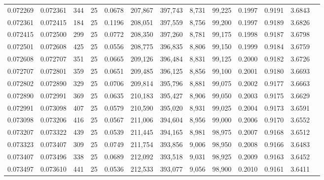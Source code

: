 \begin{tabular}{rrrrrrrrrrrrr}
0.072269 & 0.072361 &   344 &  25 &                                     0.0678 & 207,867 & 397,743 &   8,731 &  99,225 & 0.1997 & 0.9191 & 3.6843 \\
0.072361 & 0.072415 &   184 &  25 &                                     0.1196 & 208,051 & 397,559 &   8,756 &  99,200 & 0.1997 & 0.9189 & 3.6826 \\
0.072415 & 0.072500 &   299 &  25 &                                     0.0772 & 208,350 & 397,260 &   8,781 &  99,175 & 0.1998 & 0.9187 & 3.6798 \\
0.072501 & 0.072608 &   425 &  25 &                                     0.0556 & 208,775 & 396,835 &   8,806 &  99,150 & 0.1999 & 0.9184 & 3.6759 \\
0.072608 & 0.072707 &   351 &  25 &                                     0.0665 & 209,126 & 396,484 &   8,831 &  99,125 & 0.2000 & 0.9182 & 3.6726 \\
0.072707 & 0.072801 &   359 &  25 &                                     0.0651 & 209,485 & 396,125 &   8,856 &  99,100 & 0.2001 & 0.9180 & 3.6693 \\
0.072802 & 0.072890 &   329 &  25 &                                     0.0706 & 209,814 & 395,796 &   8,881 &  99,075 & 0.2002 & 0.9177 & 3.6663 \\
0.072890 & 0.072991 &   369 &  25 &                                     0.0635 & 210,183 & 395,427 &   8,906 &  99,050 & 0.2003 & 0.9175 & 3.6629 \\
0.072991 & 0.073098 &   407 &  25 &                                     0.0579 & 210,590 & 395,020 &   8,931 &  99,025 & 0.2004 & 0.9173 & 3.6591 \\
0.073098 & 0.073206 &   416 &  25 &                                     0.0567 & 211,006 & 394,604 &   8,956 &  99,000 & 0.2006 & 0.9170 & 3.6552 \\
0.073207 & 0.073322 &   439 &  25 &                                     0.0539 & 211,445 & 394,165 &   8,981 &  98,975 & 0.2007 & 0.9168 & 3.6512 \\
0.073323 & 0.073407 &   309 &  25 &                                     0.0749 & 211,754 & 393,856 &   9,006 &  98,950 & 0.2008 & 0.9166 & 3.6483 \\
0.073407 & 0.073496 &   338 &  25 &                                     0.0689 & 212,092 & 393,518 &   9,031 &  98,925 & 0.2009 & 0.9163 & 3.6452 \\
0.073497 & 0.073610 &   441 &  25 &                                     0.0536 & 212,533 & 393,077 &   9,056 &  98,900 & 0.2010 & 0.9161 & 3.6411 \\

\end{tabular}
